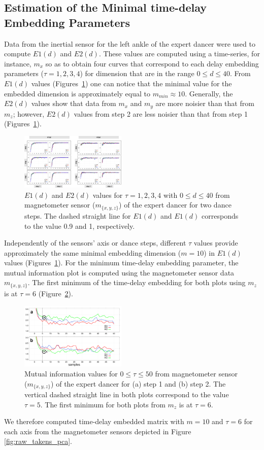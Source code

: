 \documentclass[10pt,journal,compsoc]{IEEEtran}
\begin{document}
\subsection{Estimation of the Minimal time-delay Embedding Parameters}
Data from the inertial sensor for the left ankle of the expert 
dancer were used to compute $E1(d)$ and $E2(d)$. These 
values are computed using a time-series, for instance, $m_x$
so as to obtain four curves that correspond to each delay 
embedding parameters ($\tau=1,2,3,4$) for dimension that 
are in the range $0 \leq d \leq 40$. From $E1(d)$ values (Figures~\ref{fig:e1e2exp}) 
one can notice that the minimal value for the embedded 
dimension is approximately equal to $m_{min} \approx 10$. Generally, 
the $E2(d)$ values show that data from $m_x$ and $m_y$ 
are more noisier than that from $m_z$; however, $E2(d)$ values 
from step 2 are less noisier than that from step 1  (Figures~\ref{fig:e1e2exp}).
\begin{figure}[!htb]
\centering    
\includegraphics[width=0.45\textwidth]{e1e2_values_expert}
\caption[PA]{$E1(d)$ and $E2(d)$ values for $\tau=1,2,3,4$ with $0 \leq d \leq 40$
from magnetometer sensor ($m_{ \{ x,y,z \} }$) of the expert dancer for two dance steps.
The dashed straight line for $E1(d)$ and $E1(d)$ corresponds to the value 0.9 and 1, respectively.}
\label{fig:e1e2exp}
\end{figure}
Independently of the sensors' axis or dance steps, different $\tau$ 
values provide approximately the same minimal embedding 
dimension ($m=10$) in $E1(d)$ values (Figures~\ref{fig:e1e2exp}). For the 
minimum time-delay embedding parameter, the mutual 
information plot is computed using the magnetometer sensor 
data $m_{ \{ x,y,z \} }$. The first minimum of the time-delay embedding 
for both plots using $m_z$ is at $\tau=6$ (Figure~\ref{fig:miplots}).
\begin{figure}[!htb]
\centering    
\includegraphics[width=0.45\textwidth]{miplots01}
\caption[PA]{
Mutual information values for $0 \leq \tau \leq 50$ from magnetometer sensor 
($m_{ \{ x,y,z \} }$) of the expert dancer for (a) step 1 and (b) step 2.
The vertical dashed straight line in both plots correspond to the value $\tau=5$.
The first minimum for both plots from $m_z$ is at $\tau=6$.}
\label{fig:miplots}
\end{figure}
We therefore computed time-delay 
embedded matrix with $m=10$ and $\tau = 6$ for each 
axis from the magnetometer sensors depicted in Figure \ref{fig:raw_takens_pca}.
\end{document}
